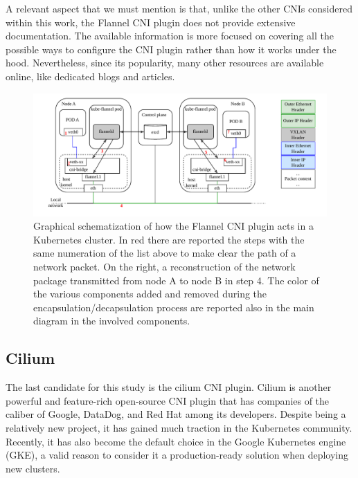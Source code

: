 A relevant aspect that we must mention is that, unlike the other CNIs considered
within this work, the Flannel CNI plugin does not provide extensive
documentation.
The available information is more focused on covering all the possible ways to
configure the CNI plugin rather than how it works under the hood.
Nevertheless, since its popularity, many other resources are available online,
like dedicated blogs and articles.


\begin{figure}
  \centering
  \includegraphics[width=\textwidth]{img/chpt2/CNI-flannel}
  \caption{Graphical schematization of how the Flannel CNI plugin acts in a
    Kubernetes cluster. In red there are reported the steps with the same
    numeration of the list above to make clear the path of a network packet.
    On the right, a reconstruction of the network package transmitted from node
    A to node B in step 4. The color of the various components added and removed
    during the encapsulation/decapsulation process are reported also in the main
    diagram in the involved components.
  }
  \label{fig:cni-flannel}
\end{figure}

\subsection{Cilium}\label{subsec:cilium}

The last candidate for this study is the cilium CNI plugin. Cilium is another
powerful and feature-rich open-source CNI plugin that has companies of the
caliber of Google, DataDog, and Red Hat among its developers. Despite being a
relatively new project, it has gained much traction in the Kubernetes community.
Recently, it has also become the default choice in the Google Kubernetes engine
(GKE), a valid reason to consider it a production-ready solution when deploying
new clusters.

